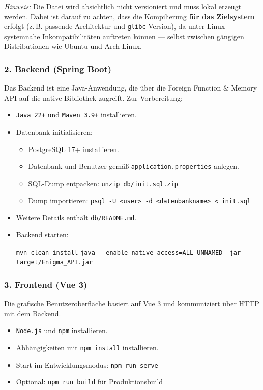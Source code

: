 \documentclass[12pt, ngerman, a4paper, numbers=noenddot]{article}
\begin{document}
\textit{Hinweis:} Die Datei wird absichtlich nicht versioniert und muss lokal erzeugt werden.  
Dabei ist darauf zu achten, dass die Kompilierung \textbf{für das Zielsystem} erfolgt (z.\,B. passende Architektur und \lstinline|glibc|-Version), da unter Linux systemnahe Inkompatibilitäten auftreten können — selbst zwischen gängigen Distributionen wie Ubuntu und Arch Linux.

\subsubsection*{2. Backend (Spring Boot)}

Das Backend ist eine Java-Anwendung, die über die Foreign Function \& Memory API auf die native Bibliothek zugreift. Zur Vorbereitung:

\begin{itemize}
	\item \lstinline|Java 22+| und \lstinline|Maven 3.9+| installieren.
	\item Datenbank initialisieren:
	\begin{itemize}
		\item PostgreSQL 17+ installieren.
		\item Datenbank und Benutzer gemäß \lstinline|application.properties| anlegen.
		\item SQL-Dump entpacken: \lstinline|unzip db/init.sql.zip|
		\item Dump importieren:  
		\lstinline|psql -U <user> -d <datenbankname> < init.sql|
	\end{itemize}
	\item Weitere Details enthält \lstinline|db/README.md|.
	\item Backend starten:
	
	\lstinline|mvn clean install|  
	\lstinline|java --enable-native-access=ALL-UNNAMED -jar target/Enigma_API.jar|
\end{itemize}

\subsubsection*{3. Frontend (Vue 3)}

Die grafische Benutzeroberfläche basiert auf Vue 3 und kommuniziert über HTTP mit dem Backend.

\begin{itemize}
	\item \lstinline|Node.js| und \lstinline|npm| installieren.
	\item Abhängigkeiten mit \lstinline|npm install| installieren.
	\item Start im Entwicklungsmodus: \lstinline|npm run serve|
	\item Optional: \lstinline|npm run build| für Produktionsbuild
\end{itemize}
\end{document}
